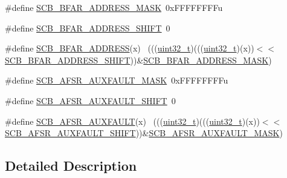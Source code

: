 \begin{DoxyCompactItemize}
\item 
\#define \hyperlink{group___s_c_b___register___masks_ga06dcfef31b1e1581acbd10898ff4518b}{S\+C\+B\+\_\+\+B\+F\+A\+R\+\_\+\+A\+D\+D\+R\+E\+S\+S\+\_\+\+M\+A\+SK}~0x\+F\+F\+F\+F\+F\+F\+F\+Fu
\item 
\#define \hyperlink{group___s_c_b___register___masks_ga31b33596b81d9fc88c64157b518bd434}{S\+C\+B\+\_\+\+B\+F\+A\+R\+\_\+\+A\+D\+D\+R\+E\+S\+S\+\_\+\+S\+H\+I\+FT}~0
\item 
\#define \hyperlink{group___s_c_b___register___masks_ga1ebe7e735178cf8245b2bfc1af3cea0a}{S\+C\+B\+\_\+\+B\+F\+A\+R\+\_\+\+A\+D\+D\+R\+E\+SS}(x)                                        ~(((\hyperlink{_p_e___types_8h_a33594304e786b158f3fb30289278f5af}{uint32\+\_\+t})(((\hyperlink{_p_e___types_8h_a33594304e786b158f3fb30289278f5af}{uint32\+\_\+t})(x))$<$$<$\hyperlink{group___s_c_b___register___masks_ga31b33596b81d9fc88c64157b518bd434}{S\+C\+B\+\_\+\+B\+F\+A\+R\+\_\+\+A\+D\+D\+R\+E\+S\+S\+\_\+\+S\+H\+I\+FT}))\&\hyperlink{group___s_c_b___register___masks_ga06dcfef31b1e1581acbd10898ff4518b}{S\+C\+B\+\_\+\+B\+F\+A\+R\+\_\+\+A\+D\+D\+R\+E\+S\+S\+\_\+\+M\+A\+SK})
\item 
\#define \hyperlink{group___s_c_b___register___masks_ga7664f289a25c34670bd752c23fd47c8a}{S\+C\+B\+\_\+\+A\+F\+S\+R\+\_\+\+A\+U\+X\+F\+A\+U\+L\+T\+\_\+\+M\+A\+SK}~0x\+F\+F\+F\+F\+F\+F\+F\+Fu
\item 
\#define \hyperlink{group___s_c_b___register___masks_ga6e27cdbb224a5d0a575fce61386ea774}{S\+C\+B\+\_\+\+A\+F\+S\+R\+\_\+\+A\+U\+X\+F\+A\+U\+L\+T\+\_\+\+S\+H\+I\+FT}~0
\item 
\#define \hyperlink{group___s_c_b___register___masks_gaf77ae10495cf1061dfa77ceda3454679}{S\+C\+B\+\_\+\+A\+F\+S\+R\+\_\+\+A\+U\+X\+F\+A\+U\+LT}(x)                                      ~(((\hyperlink{_p_e___types_8h_a33594304e786b158f3fb30289278f5af}{uint32\+\_\+t})(((\hyperlink{_p_e___types_8h_a33594304e786b158f3fb30289278f5af}{uint32\+\_\+t})(x))$<$$<$\hyperlink{group___s_c_b___register___masks_ga6e27cdbb224a5d0a575fce61386ea774}{S\+C\+B\+\_\+\+A\+F\+S\+R\+\_\+\+A\+U\+X\+F\+A\+U\+L\+T\+\_\+\+S\+H\+I\+FT}))\&\hyperlink{group___s_c_b___register___masks_ga7664f289a25c34670bd752c23fd47c8a}{S\+C\+B\+\_\+\+A\+F\+S\+R\+\_\+\+A\+U\+X\+F\+A\+U\+L\+T\+\_\+\+M\+A\+SK})
\end{DoxyCompactItemize}


\subsection{Detailed Description}


